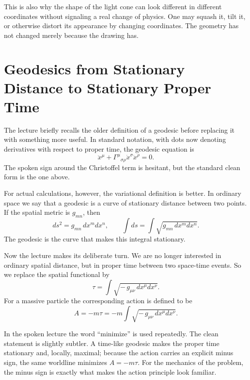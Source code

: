 This is also why the shape of the light cone can look different in different coordinates without signaling a real change of physics. One may squash it, tilt it, or otherwise distort its appearance by changing coordinates. The geometry has not changed merely because the drawing has.

\section{Geodesics from Stationary Distance to Stationary Proper Time}

The lecture briefly recalls the older definition of a geodesic before replacing it with something more useful. In standard notation, with dots now denoting derivatives with respect to proper time, the geodesic equation is
\begin{equation}
\ddot x^\mu + \Gamma^\mu{}_{\sigma\rho}\dot x^\sigma \dot x^\rho = 0.
\end{equation}
The spoken sign around the Christoffel term is hesitant, but the standard clean form is the one above.

For actual calculations, however, the variational definition is better. In ordinary space we say that a geodesic is a curve of stationary distance between two points. If the spatial metric is \(g_{mn}\), then
\begin{equation}
ds^2 = g_{mn}\,dx^m dx^n,
\qquad
\int ds = \int \sqrt{g_{mn}\,dx^m dx^n}.
\end{equation}
The geodesic is the curve that makes this integral stationary.

Now the lecture makes its deliberate turn. We are no longer interested in ordinary spatial distance, but in proper time between two space-time events. So we replace the spatial functional by
\begin{equation}
\tau = \int \sqrt{-\,g_{\mu\nu}\,dx^\mu dx^\nu}.
\end{equation}
For a massive particle the corresponding action is defined to be
\begin{equation}
A = -m\tau = -m\int \sqrt{-\,g_{\mu\nu}\,dx^\mu dx^\nu}.
\end{equation}

In the spoken lecture the word ``minimize'' is used repeatedly. The clean statement is slightly subtler. A time-like geodesic makes the proper time stationary and, locally, maximal; because the action carries an explicit minus sign, the same worldline minimizes \(A=-m\tau\). For the mechanics of the problem, the minus sign is exactly what makes the action principle look familiar.

